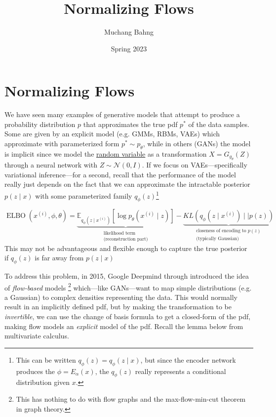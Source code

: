 \documentclass{article}
\DeclareMathOperator{\elbo}{ELBO}
\begin{document}

\title{Normalizing Flows}
\author{Muchang Bahng}
\date{Spring 2023}

\maketitle
\tableofcontents
\pagebreak 




\section{Normalizing Flows} 

  We have seen many examples of generative models that attempt to produce a probability distribution $p$ that approximates the true pdf $p^\ast$ of the data samples. Some are given by an explicit model (e.g. GMMs, RBMs, VAEs) which approximate with parameterized form $p^\ast \sim p_\theta$, while in others (GANs) the model is implicit since we model the \hyperref[prob-def:random-variable]{random variable} as a transformation $X = G_{g_\theta} (Z)$ through a neural network with $Z \sim \mathcal{N}(0, I)$. If we focus on VAEs---specifically variational inference---for a second, recall that the performance of the model really just depends on the fact that we can approximate the intractable posterior $p(z \mid x)$ with some parameterized family $q_\phi (z)$\footnote{This can be written $q_\phi (z) = q_\phi (z \mid x)$, but since the encoder network produces the $\phi = E_\alpha (x)$, the $q_\phi(z)$ really represents a conditional distribution given $x$.} 

  \begin{equation}
    \elbo(x^{(i)}, \phi, \theta) = \underbrace{\mathbb{E}_{q_\phi (z \mid x^{(i)})} [\log p_{\theta} (x^{(i)} \mid z)]}_{\substack{\text{likelihood term} \\ \text{(reconstruction part)}}}- \underbrace{KL(q_{\phi} (z \mid x^{(i)}) \mid\mid p(z))}_{\substack{\text{closeness of encoding to } p(z) \\ \text{(typically Gaussian)}}}
  \end{equation}
  This may not be advantageous and flexible enough to capture the true posterior if $q_\phi(z)$ is far away from $p(z \mid x)$

  To address this problem, in 2015, Google Deepmind through \cite{flow} introduced the idea of \textit{flow-based} models \footnote{This has nothing to do with flow graphs and the max-flow-min-cut theorem in graph theory.} which---like GANs---want to map simple distributions (e.g. a Gaussian) to complex densities representing the data. This would normally result in an implicitly defined pdf, but by making the transformation to be \textit{invertible}, we can use the change of basis formula to get a closed-form of the pdf, making flow models an \textit{explicit} model of the pdf. Recall the lemma below from multivariate calculus. 
  
\end{document}
